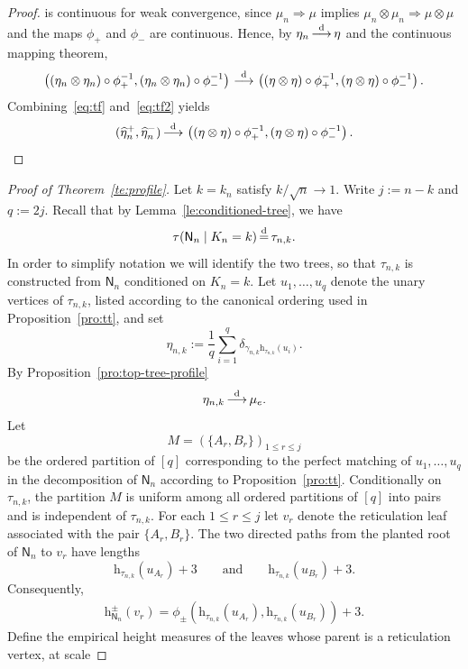 \documentclass[english,11pt]{smfart}
\newcommand{\convdis}{\,{\buildrel \mathrm{d} \over \longrightarrow}\,}
\newcommand{\eqdist}{\,{\buildrel \mathrm{d} \over =}\,}
\newcommand{\he}{\mathrm{h}}
\newcommand{\mN}{\mathsf{N}}
\numberwithin{equation}{section}
\begin{document}
\begin{proof}
		is continuous for weak convergence, since $\mu_n \Rightarrow \mu$ implies $\mu_n\otimes\mu_n\Rightarrow\mu\otimes\mu$ and the maps $\phi_+$ and $\phi_-$ are continuous. Hence, by $\eta_n \convdis \eta$ and the continuous mapping theorem,
		\begin{align}
			\label{eq:tf2}
			\left( (\eta_n\otimes\eta_n)\circ\phi_+^{-1}, (\eta_n\otimes\eta_n)\circ\phi_-^{-1}\right) \convdis \left( (\eta\otimes\eta)\circ\phi_+^{-1}, (\eta\otimes\eta)\circ\phi_-^{-1}\right).
		\end{align}
		Combining~\eqref{eq:tf} and~\eqref{eq:tf2} yields
		\[
			(\widehat{\eta}_n^+, \widehat{\eta}_n^-) \convdis \left( (\eta\otimes\eta)\circ\phi_+^{-1}, (\eta\otimes\eta)\circ\phi_-^{-1}\right).
		\]
\end{proof}


\begin{proof}[Proof of Theorem~\ref{te:profile}]
	Let $k=k_n$ satisfy $k / \sqrt{n} \to 1$. Write $j:=n-k$ and $q:=2j$. Recall that by Lemma~\ref{le:conditioned-tree}, we have
	\[
		\tau(\mN_n \mid K_n=k) \eqdist \tau_{n,k}.
	\]
	In order to simplify notation we will identify the two trees, so that $\tau_{n,k}$ is constructed from $\mN_n$ conditioned on $K_n=k$. Let $u_1,\ldots,u_q$ denote the unary vertices of $\tau_{n,k}$, listed according to the canonical ordering used in Proposition~\ref{pro:tt}, and set
	\[
		\eta_{n,k} := \frac{1}{q}\sum_{i=1}^{q} \delta_{\gamma_{n,k}\he_{\tau_{n,k}}(u_i)}.
	\]
	By Proposition~\ref{pro:top-tree-profile}
	\begin{equation}
		\eta_{n,k} \convdis \mu_e.
	\end{equation}
	Let
	\[
		M = \left(\{A_r,B_r\}\right)_{1 \le r \le j}
	\]
	be the ordered partition of $[q]$ corresponding to the perfect matching of $u_1,\ldots,u_q$ in the decomposition of $\mN_n$ according to Proposition~\ref{pro:tt}. Conditionally on $\tau_{n,k}$, the partition $M$ is uniform among all ordered partitions of $[q]$ into pairs and is independent of $\tau_{n,k}$. For each $1 \le r \le j$ let $v_r$ denote the reticulation leaf associated with the pair $\{A_r,B_r\}$. The two directed paths from the planted root of $\mN_n$ to $v_r$ have lengths
	\[
		\he_{\tau_{n,k}}(u_{A_r})+3 \qquad \text{and} \qquad \he_{\tau_{n,k}}(u_{B_r})+3.
	\]
	Consequently,
	\begin{align}
		\label{eq:heq}
		\he_{\mN_n}^{\pm}(v_r) = \phi_\pm\left(\he_{\tau_{n,k}}(u_{A_r}), \he_{\tau_{n,k}}(u_{B_r}) \right)+3.
	\end{align}
	Define the empirical height measures of the leaves whose parent is a reticulation vertex, at scale

\end{proof}
\end{document}
